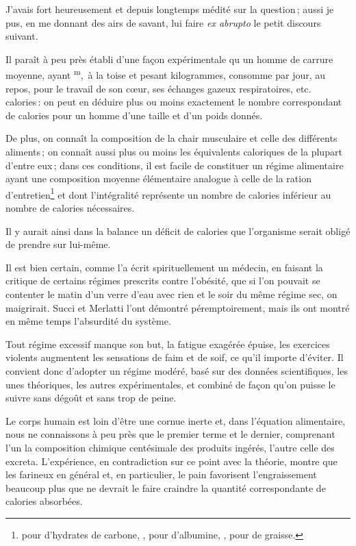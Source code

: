J'avais fort heureusement et depuis longtemps médité sur la question ; aussi je
pus, en me donnant des airs de savant, lui faire \textit{ex abrupto} le petit
discours suivant.

Il paraît à peu près établi d'une façon expérimentale qu un homme de carrure
moyenne, ayant {\mmm}\textsuperscript{m}, {\mmm} à la toise et pesant
{\mmm} kilogrammes, consomme par jour, au repos, pour le travail de son
cœur, ses échanges gazeux respiratoires, etc. {\mmm} {\mmm}
calories : on peut en déduire plus ou moins exactement le nombre correspondant
de calories pour un homme d'une taille et d'un poids donnés.

De plus, on connaît la composition de la chair musculaire et celle des
différents aliments ; on connaît aussi plus ou moins les équivalents caloriques
de la plupart d’entre eux ; dans ces conditions, il est facile de constituer un
régime alimentaire ayant une composition moyenne élémentaire analogue à celle
de la ration d'entretien\footnote{{\mmm} pour {\mmm} d'hydrates de
carbone, {\mmm},{\mmm} pour {\mmm} d'albumine,
{\mmm},{\mmm} pour {\mmm} de graisse.} et dont l'intégralité
représente un nombre de calories inférieur au nombre de calories nécessaires.

Il y aurait ainsi dans la balance un déficit de calories que l'organisme serait
obligé de prendre sur lui-même.

Il est bien certain, comme l'a écrit spirituellement un médecin, en faisant la
critique de certains régimes prescrits contre l'obésité, que si l'on pouvait se
contenter le matin d'un verre d'eau avec rien et le soir du même régime sec, on
maigrirait. Succi et Merlatti l'ont démontré péremptoirement, mais ils ont
montré en même temps l'absurdité du système.

Tout régime excessif manque son but, la fatigue exagérée épuise, les exercices
violents augmentent les sensations de faim et de soif, ce qu'il importe
d'éviter. Il convient donc d'adopter un régime modéré, basé sur des données
scientifiques, les unes théoriques, les autres expérimentales, et combiné de
façon qu'on puisse le suivre sans dégoût et sans trop de peine.

Le corps humain est loin d'être une cornue inerte et, dans l'équation
alimentaire, nous ne connaissons à peu près que le premier terme et le dernier,
comprenant l'un la composition chimique centésimale des produits ingérés,
l'autre celle des excreta. L'expérience, en contradiction sur ce point avec la
théorie, montre que les farineux en général et, en particulier, le pain
favorisent l'engraissement beaucoup plus que ne devrait le faire craindre la
quantité correspondante de calories absorbées.

